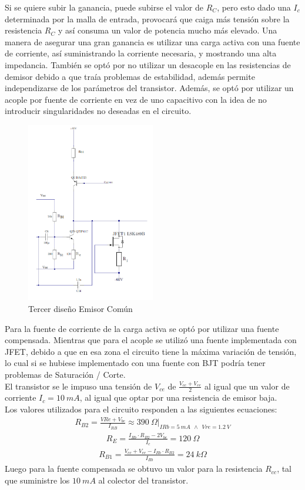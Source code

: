 Si se quiere subir la ganancia, puede subirse el valor de $R_C$, pero esto dado una $I_c$ determinada por la  malla de entrada, provocará que caiga más tensión sobre la resistencia $R_C$ y así consuma un valor de potencia mucho más elevado. Una manera de asegurar una gran ganancia es utilizar una carga activa con una fuente de corriente, así suministrando la corriente necesaria, y mostrando una alta impedancia.
También se optó por no utilizar un desacople en las resistencias de demisor debido a que traía problemas de estabilidad, además permite independizarse de los parámetros del transistor.
Además, se optó por utilizar un acople por fuente de corriente en vez de uno capacitivo con la idea de no introducir singularidades no deseadas en el circuito.
 \begin{figure}[H]
\centering
	\includegraphics[width=0.5\textwidth]{ImagenesGain-Stage/ec3.png}
	\caption{Tercer diseño Emisor Común}
	\label{fig:ec3}
\end{figure}

Para la fuente de corriente de la carga activa se optó por utilizar una fuente compensada. Mientras que para el acople se utilizó una fuente implementada con JFET, debido a que en esa zona el circuito tiene la máxima variación de tensión, lo cual si se hubiese implementado con una fuente con BJT podría tener problemas de Saturación / Corte.\\
El transistor se le impuso una tensión de $V_{ce}$ de $\frac{V_{cc}+V_{ee}}{2}$ al igual que un valor de corriente $I_c = 10 \ mA$, al igual que optar por una resistencia de emisor baja.\\
Los valores utilizados para el circuito responden a las siguientes ecuaciones:
\begin{align}
R_{B2}= \frac{V{Re}+V_{be}}{I_{RB}} \approx 390 \ \Omega |_{IRb=5 \ mA \  \ \wedge \ \  Vre=1.2 \ V}
\end{align}
\begin{align}
R_E=\frac{I_{Rb}\cdot R_{B2}-2V_{be}}{I_c}=120 \ \Omega
\end{align}
\begin{align}
R_{B1}= \frac{V_{cc}+V_{ee}-I_{Rb}\cdot R_{B2} }{I_{Rb}}=24 \ k\Omega
\end{align}
Luego para la fuente compensada se obtuvo un valor para la resistencia $R_{cc}$, tal que suministre los $10 \ mA$ al colector del transistor.

